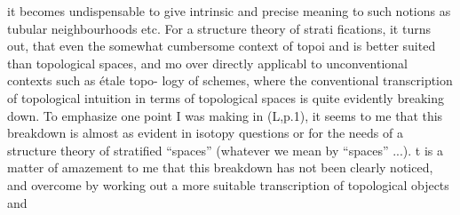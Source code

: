 it becomes undispensable to give intrinsic and precise meaning to such
notions as tubular neighbourhoods etc. For a structure theory of strati
fications, it turns out, that even the somewhat cumbersome context of
topoi and  is better suited than topological spaces, and mo
over directly applicabl to unconventional contexts such as étale topo-%
logy of schemes, where the conventional transcription of topological
intuition in terms of topological spaces is quite evidently breaking
down. To emphasize one point I was making in (L,p.1), it seems to me
that this breakdown is almost as evident in  isotopy questions\hand{,} or
for the needs of a structure theory of stratified ``spaces'' (whatever we
mean by ``spaces'' ...).  t is a matter of amazement to me that this
breakdown has not been clearly noticed, and  overcome by 
working out a more suitable transcription of topological objects and
